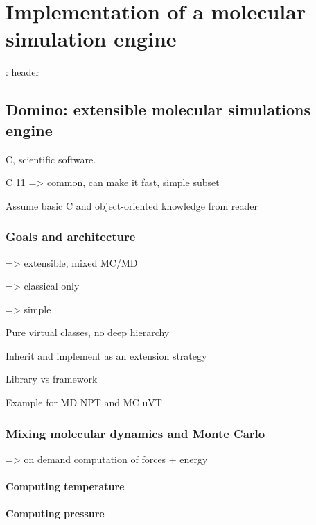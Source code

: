 \documentclass[thesis]{subfiles}
\begin{document}
\def\cxx{{C\nolinebreak[4]\hspace{-.05em}\raisebox{.3ex}{\footnotesize ++}}\xspace}

\OnlyInSubfile{\setcounter{chapter}{5}}

\chapter{Implementation of a molecular simulation engine}

\baselineskip
\TODO: header

\newpage
\section{Domino: extensible molecular simulations engine}

\cxx, scientific software.

\cxx11 => common, can make it fast, simple subset

Assume basic \cxx and object-oriented knowledge from reader

\subsection{Goals and architecture}

=> extensible, mixed MC/MD

=> classical only

=> simple

Pure virtual classes, no deep hierarchy

Inherit and implement as an extension strategy

Library vs framework

Example for MD NPT and MC uVT

\subsection{Mixing molecular dynamics and Monte Carlo}

=> on demand computation of forces + energy

\subsubsection{Computing temperature}

\subsubsection{Computing pressure}
\end{document}
